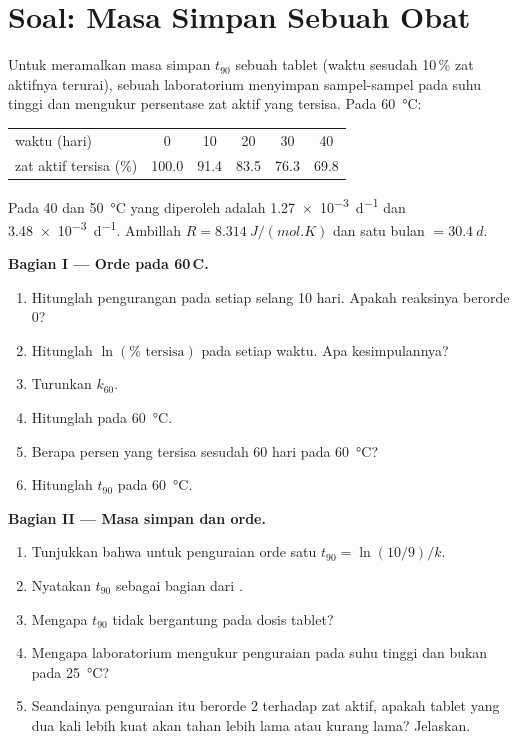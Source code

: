 \section{Soal: Masa Simpan Sebuah Obat}

\begin{problem}
\label{pb:b1:rate-laws:1}
Untuk meramalkan masa simpan $t_{90}$ sebuah tablet (waktu sesudah
10\,\% zat aktifnya terurai), sebuah laboratorium menyimpan sampel-sampel
pada suhu tinggi dan mengukur persentase zat aktif yang tersisa. Pada
\qty{60}{\celsius}:
\begin{center}
\begin{tabular}{lccccc}
\hline
waktu (hari) & 0 & 10 & 20 & 30 & 40 \\
zat aktif tersisa (\%) & 100.0 & 91.4 & 83.5 & 76.3 & 69.8 \\
\hline
\end{tabular}
\end{center}
Pada 40 dan \qty{50}{\celsius}  yang diperoleh adalah
\qty{1.27e-3}{d^{-1}} dan \qty{3.48e-3}{d^{-1}}. Ambillah $R =
\qty{8.314}{J/(mol.K)}$ dan satu bulan $= \qty{30.4}{d}$.

\medskip
\noindent\textbf{Bagian I --- Orde pada 60\,\textdegree C.}
\begin{enumerate}
  \item Hitunglah pengurangan pada setiap selang 10 hari. Apakah reaksinya
        berorde 0?
  \item Hitunglah $\ln(\%\text{ tersisa})$ pada setiap waktu. Apa
        kesimpulannya?
  \item Turunkan  $k_{60}$.
  \item Hitunglah  pada \qty{60}{\celsius}.
  \item Berapa persen yang tersisa sesudah 60 hari pada \qty{60}{\celsius}?
  \item Hitunglah $t_{90}$ pada \qty{60}{\celsius}.
\end{enumerate}

\medskip
\noindent\textbf{Bagian II --- Masa simpan dan orde.}
\begin{enumerate}[resume]
  \item Tunjukkan bahwa untuk penguraian orde satu $t_{90} = \ln(10/9)/k$.
  \item Nyatakan $t_{90}$ sebagai bagian dari .
  \item Mengapa $t_{90}$ tidak bergantung pada dosis tablet?
  \item Mengapa laboratorium mengukur penguraian pada suhu tinggi dan
        bukan pada \qty{25}{\celsius}?
  \item Seandainya penguraian itu berorde 2 terhadap zat aktif, apakah
        tablet yang dua kali lebih kuat akan tahan lebih lama atau kurang
        lama? Jelaskan.
\end{enumerate}


\end{problem}
